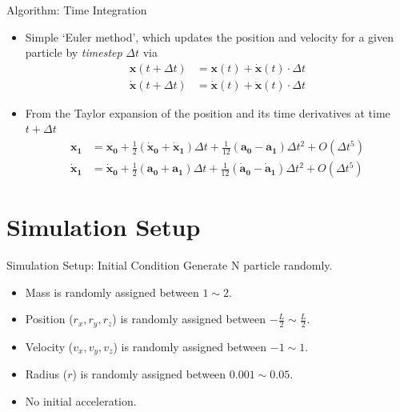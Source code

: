 \documentclass[10pt, xcolor = svgnames, aspectratio=43]{beamer} %
\begin{document}
\begin{frame}{Algorithm: Time Integration}


\begin{itemize}
	\item Simple `Euler method', which updates the position and velocity for a given particle by \textit{timestep} $\Delta t$ via
	\begin{align}
		\mathbf{x} \left( t + \Delta t \right)
		& = \mathbf{x} \left( t \right) + \mathbf{\dot x} \left( t \right) \cdot \Delta t \\
		\mathbf{\dot x} \left( t + \Delta t \right)
		& = \mathbf{\dot x} \left( t \right) + \mathbf{\ddot x} \left( t \right) \cdot \Delta t
	\end{align}
	
	\item From the Taylor expansion of the position and its time derivatives at time $t + \Delta t$
	\begin{align}
		\mathbf{x_1}
		& = \mathbf{x_0} + \frac{1}{2} \left( \mathbf{\dot x_0} + \mathbf{\dot x_1} \right) \Delta t + \frac{1}{12} \left( \mathbf{a_0} - \mathbf{a_1} \right) \Delta t^2 + O \left( \Delta t^5 \right) \\
		\mathbf{\dot x_1}
		& = \mathbf{\dot x_0} + \frac{1}{2} \left( \mathbf{a_0} + \mathbf{a_1} \right) \Delta t + \frac{1}{12} \left( \mathbf{\dot a_0} - \mathbf{\dot a_1} \right) \Delta t^2 + O \left( \Delta t^5 \right)
	\end{align}
\end{itemize}


\end{frame}







\section{Simulation Setup}


\begin{frame}[fragile]{Simulation Setup: Initial Condition}
Generate N particle randomly.
\begin{itemize}
	\item Mass is randomly assigned between $1 \sim 2$.
	\item Position ($r_x, r_y, r_z$) is randomly assigned between $- \frac{L}{2} \sim \frac{L}{2}$.
	\item Velocity ($v_x, v_y, v_z$) is randomly assigned between $-1 \sim 1$.
	\item Radius ($r$) is randomly assigned between $0.001 \sim 0.05$.
	\item No initial acceleration.
\end{itemize}
\end{frame}
\end{document}
